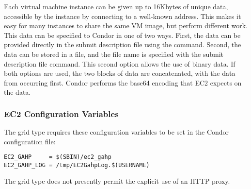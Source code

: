 Each virtual machine instance can be given up to 16Kbytes of unique data, 
accessible by the instance by connecting to a well-known address.
This makes it easy for many instances to share the same VM image,
but perform different work.
This data can be specified to Condor in one of two ways.
First, the data can be provided directly in the submit description file 
using the  command.
Second, the data can be
stored in a file, and the file name is specified with the
 submit description file command.
This second option allows the use of binary data.
If both options are used, the two blocks of
data are concatenated, with the data from  
occurring first.  Condor performs the base64 encoding that EC2 expects on 
the data.

\subsubsection{\label{sec:Amazon-config}EC2 Configuration Variables}

The  grid type requires these configuration variables 
to be set in the Condor configuration file:

\footnotesize
\begin{verbatim}
EC2_GAHP     = $(SBIN)/ec2_gahp
EC2_GAHP_LOG = /tmp/EC2GahpLog.$(USERNAME)
\end{verbatim}
\normalsize

The  grid type does not presently permit the explicit use 
of an HTTP proxy.
